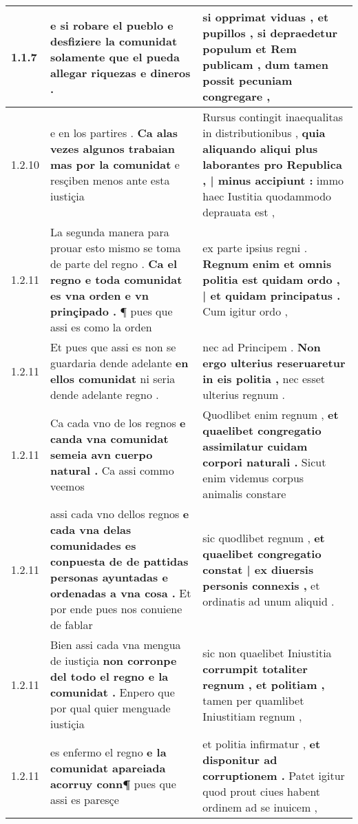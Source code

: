\begin{tabular}{|p{1cm}|p{6.5cm}|p{6.5cm}|}

\hline
1.1.7 & e si robare el pueblo \textbf{ e desfiziere la comunidat solamente } que el pueda allegar riquezas e dineros . & si opprimat viduas , et pupillos , \textbf{ si depraedetur populum et Rem publicam , } dum tamen possit pecuniam congregare , \\\hline
1.2.10 & e en los partires . \textbf{ Ca alas vezes algunos trabaian mas por la comunidat } e resçiben menos ante esta iustiçia & Rursus contingit inaequalitas in distributionibus , \textbf{ quia aliquando aliqui plus laborantes pro Republica , | minus accipiunt : } immo haec Iustitia quodammodo deprauata est , \\\hline
1.2.11 & La segunda manera para prouar esto mismo se toma de parte del regno . \textbf{ Ca el regno e toda comunidat es vna orden e vn prinçipado . } ¶ pues que assi es como la orden & ex parte ipsius regni . \textbf{ Regnum enim et omnis politia est quidam ordo , | et quidam principatus . } Cum igitur ordo , \\\hline
1.2.11 & Et pues que assi es non se guardaria dende adelante \textbf{ en ellos comunidat } ni seria dende adelante regno . & nec ad Principem . \textbf{ Non ergo ulterius reseruaretur in eis politia , } nec esset ulterius regnum . \\\hline
1.2.11 & Ca cada vno de los regnos \textbf{ e canda vna comunidat semeia avn cuerpo natural . } Ca assi commo veemos & Quodlibet enim regnum , \textbf{ et quaelibet congregatio assimilatur cuidam corpori naturali . } Sicut enim videmus corpus animalis constare \\\hline
1.2.11 & assi cada vno dellos regnos \textbf{ e cada vna delas comunidades es conpuesta de de pattidas personas ayuntadas e ordenadas a vna cosa . } Et por ende pues nos conuiene de fablar & sic quodlibet regnum , \textbf{ et quaelibet congregatio constat | ex diuersis personis connexis , } et ordinatis ad unum aliquid . \\\hline
1.2.11 & Bien assi cada vna mengua de iustiçia \textbf{ non corronpe del todo el regno e la comunidat . } Enpero que por qual quier menguade iustiçia & sic non quaelibet Iniustitia \textbf{ corrumpit totaliter regnum , et politiam , } tamen per quamlibet Iniustitiam regnum , \\\hline
1.2.11 & es enfermo el regno \textbf{ e la comunidat apareiada acorruy conn¶ } pues que assi es paresçe & et politia infirmatur , \textbf{ et disponitur ad corruptionem . } Patet igitur quod prout ciues habent ordinem ad se inuicem , \\\hline

\end{tabular}
